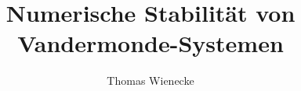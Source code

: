 \documentclass[a4paper, oneside, 11pt]{scrreprt}
\title{Numerische Stabilität von Vandermonde-Systemen}
\author{Thomas Wienecke}
\begin{document}
\maketitle
\tableofcontents



%











%

\appendix

\renewcommand{\harvardand}{und}

\end{document}
